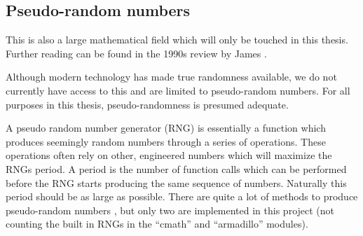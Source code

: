 % 

\subsection{Pseudo-random numbers}

This is also a large mathematical field which will only be touched in this thesis. 
Further reading can be found in the 1990s review by James \cite{james1990review}. 

Although modern technology has made true randomness available, we do not currently have access to this and are limited to pseudo-random numbers. 
For all purposes in this thesis, pseudo-randomness is presumed adequate. 

A pseudo random number generator (RNG) is essentially a function which produces seemingly random numbers through a series of operations. 
These operations often rely on other, engineered numbers which will maximize the RNGs period. 
A period is the number of function calls which can be performed before the RNG starts producing the same sequence of numbers. 
Naturally this period should be as large as possible. 
There are quite a lot of methods to produce pseudo-random numbers \cite{james1990review}, but only two are implemented in this project (not counting the built in RNGs in the ``cmath'' and ``armadillo'' modules). 

